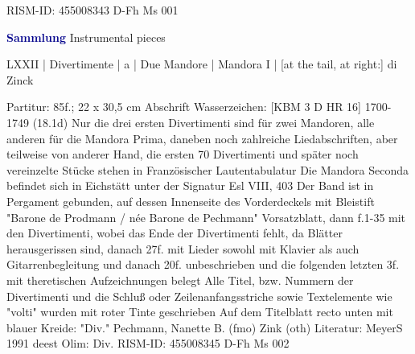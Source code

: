 \documentclass[twocolumn]{book}
\begin{document}
\newline RISM-ID: 455008343
\newline D-Fh  Ms 001
\newline \par \vspace{7pt} \textcolor{darkblue}{\textbf{Sammlung}}
 Instrumental pieces
\newline \begin{itshape} LXXII | Divertimente | a | Due Mandore | Mandora I | [at the tail, at right:] di Zinck\end{itshape} 
\newline \textcolor{darkblue}{}  Partitur: 85f.; 22 x 30,5 cm
\newline Abschrift
\newline Wasserzeichen: [KBM 3 D HR 16]  1700-1749 (18.1d)
\newline Nur die drei ersten Divertimenti sind für zwei Mandoren, alle anderen für die Mandora Prima, daneben noch zahlreiche Liedabschriften, aber teilweise von anderer Hand, die ersten 70 Divertimenti und später noch vereinzelte Stücke stehen in Französischer Lautentabulatur
\newline Die Mandora Seconda befindet sich in Eichstätt unter der Signatur Esl VIII, 403
\newline Der Band ist in Pergament gebunden, auf dessen Innenseite des Vorderdeckels mit Bleistift "Barone de Prodmann / née Barone de Pechmann"
\newline Vorsatzblatt, dann f.1-35 mit den Divertimenti, wobei das Ende der Divertimenti fehlt, da Blätter herausgerissen sind, danach 27f. mit Lieder sowohl mit Klavier als auch Gitarrenbegleitung und danach 20f. unbeschrieben und die folgenden letzten 3f. mit theretischen Aufzeichnungen belegt
\newline Alle Titel, bzw. Nummern der Divertimenti und die Schluß oder Zeilenanfangsstriche sowie Textelemente wie "volti" wurden mit roter Tinte geschrieben
\newline Auf dem Titelblatt recto unten mit blauer Kreide: "Div."
\newline Pechmann, Nanette B.  (fmo)
\newline Zink  (oth)
\newline Literatur: MeyerS 1991  deest
\newline Olim: Div.
\newline RISM-ID: 455008345
\newline D-Fh  Ms 002
    \clearpage  
\end{document}
